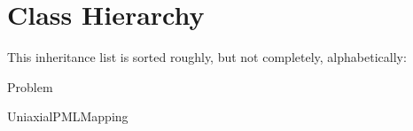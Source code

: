 \section{Class Hierarchy}
This inheritance list is sorted roughly, but not completely, alphabetically\+:\begin{DoxyCompactList}
\item Problem\begin{DoxyCompactList}
\item {}
\item {}
\end{DoxyCompactList}
\item Uniaxial\+P\+M\+L\+Mapping\begin{DoxyCompactList}
\item {}
\end{DoxyCompactList}
\end{DoxyCompactList}
